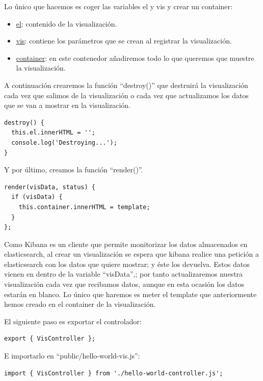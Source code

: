 \documentclass[a4paper, 12pt]{book}
\begin{document}
Lo único que hacemos es coger las variables el y vis y crear un container:

\begin{itemize}
    \item \underline{el}: contenido de la visualización.
    \item \underline{vis}: contiene los parámetros que se crean al registrar la visualización.
    \item \underline{container}: en este contenedor añadiremos todo lo que queremos que muestre la visualización.
\end{itemize}

A continuación crearemos la función “destroy()” que destruirá la visualización cada vez que salimos de la visualización o cada vez que actualizamos los datos que se van a mostrar en la visualización.

\begin{lstlisting}[frame=single]
destroy() {
  this.el.innerHTML = '';
  console.log('Destroying...');
}
\end{lstlisting}

Y por último, creamos la función “render()”.

\begin{lstlisting}[frame=single]
render(visData, status) {
  if (visData) {
    this.container.innerHTML = template;
  }
};
\end{lstlisting}

Como Kibana es un cliente que permite monitorizar los datos almacenados en elasticsearch, al crear un visualización se espera que kibana realice una petición a elasticsearch con los datos que quiere mostrar; y éste los devuelva. Estos datos vienen en dentro de la variable “visData”,; por tanto actualizaremos nuestra visualización cada vez que recibamos datos, aunque en esta ocasión los datos estarán en blanco. 
Lo único que haremos es meter el template que anteriormente hemos creado en el container de la visualización.

El siguiente paso es exportar el controlador:

\begin{lstlisting}[frame=single]
export { VisController };
\end{lstlisting}

E importarlo en “public/hello-world-vis.js”:

\begin{lstlisting}[frame=single]
import { VisController } from './hello-world-controller.js';
\end{lstlisting}
\end{document}
